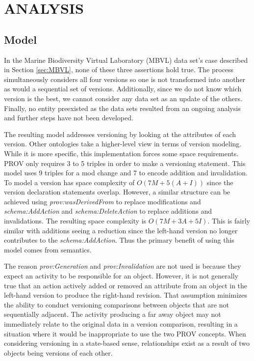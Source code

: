 
\chapter{ANALYSIS}

\section{Model}

In the Marine Biodiversity Virtual Laboratory (MBVL) data set's case described in Section \ref{sec:MBVL}, none of these three assertions hold true. 
The process simultaneously considers all four versions so one is not transformed into another as would a sequential set of versions.
Additionally, since we do not know which version is the best, we cannot consider any data set as an update of the others.
Finally, no entity preexisted as the data sets resulted from an ongoing analysis and further steps have not been developed.

The resulting model addresses versioning by looking at the attributes of each version.
Other ontologies take a higher-level view in terms of version modeling.
While it is more specific, this implementation forces some space requirements.
PROV only requires 3 to 5 triples in order to make a versioning statement.
This model uses 9 triples for a mod change and 7 to encode addition and invalidation.
To model a version has space complexity of \(O(7M+5(A+I))\) since the version declaration statements overlap.
However, a similar structure can be achieved using \textit{prov:wasDerivedFrom} to replace modifications and \textit{schema:AddAction} and \textit{schema:DeleteAction} to replace additions and invalidations.
The resulting space complexity is \(O(7M+3A+5I)\).
This is fairly similar with additions seeing a reduction since the left-hand version no longer contributes to the \textit{schema:AddAction}.
Thus the primary benefit of using this model comes from semantics.

The reason \textit{prov:Generation} and \textit{prov:Invalidation} are not used is because they expect an activity to be responsible for an object.
However, it is not generally true that an action actively added or removed an attribute from an object in the left-hand version to produce the right-hand revision.
That assumption minimizes the ability to conduct versioning comparisons between objects that are not sequentially adjacent.
The activity producing a far away object may not immediately relate to the original data in a version comparison, resulting in a situation where it would be inappropriate to use the two PROV concepts.
When considering versioning in a state-based sense, relationships exist as a result of two objects being versions of each other.

